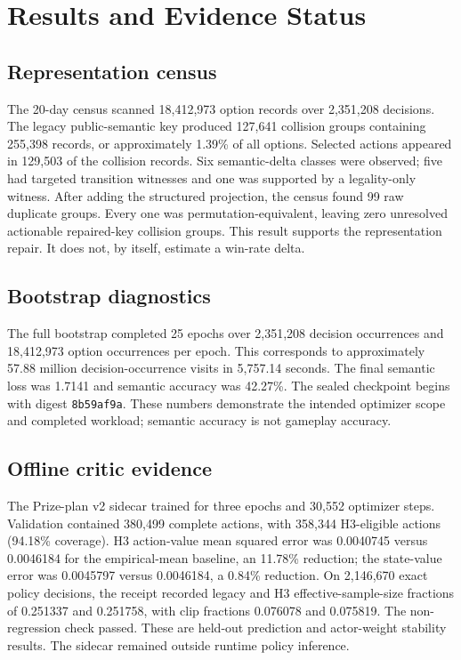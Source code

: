 \section{Results and Evidence Status}

\subsection{Representation census}

The 20-day census scanned 18,412,973 option records over 2,351,208 decisions.
The legacy public-semantic key produced 127,641 collision groups containing
255,398 records, or approximately 1.39\% of all options. Selected actions
appeared in 129,503 of the collision records. Six semantic-delta classes were
observed; five had targeted transition witnesses and one was supported by a
legality-only witness. After adding the structured projection, the census found
99 raw duplicate groups. Every one was permutation-equivalent, leaving zero
unresolved actionable repaired-key collision groups. This result supports the
representation repair. It does not, by itself, estimate a win-rate delta.

\subsection{Bootstrap diagnostics}

The full bootstrap completed 25 epochs over 2,351,208 decision occurrences and
18,412,973 option occurrences per epoch. This corresponds to approximately
57.88 million decision-occurrence visits in 5,757.14 seconds. The final
semantic loss was 1.7141 and semantic accuracy was 42.27\%. The sealed
checkpoint begins with digest \texttt{8b59af9a}. These numbers demonstrate the
intended optimizer scope and completed workload; semantic accuracy is not
gameplay accuracy.

\subsection{Offline critic evidence}

The Prize-plan v2 sidecar trained for three epochs and 30,552 optimizer steps.
Validation contained 380,499 complete actions, with 358,344 H3-eligible actions
(94.18\% coverage). H3 action-value mean squared error was 0.0040745 versus
0.0046184 for the empirical-mean baseline, an 11.78\% reduction; the state-value
error was 0.0045797 versus 0.0046184, a 0.84\% reduction. On 2,146,670 exact
policy decisions, the receipt recorded legacy and H3 effective-sample-size
fractions of 0.251337 and 0.251758, with clip fractions 0.076078 and 0.075819.
The non-regression check passed. These are held-out prediction and actor-weight
stability results. The sidecar remained outside runtime policy inference.


